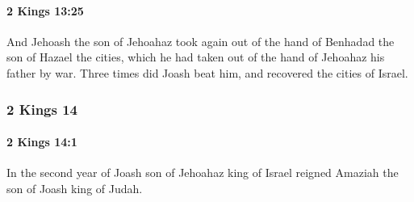 		\paragraph{2 Kings 13:25} %
			\label{2KINGS-13-25}

			And Jehoash the son of Jehoahaz took again out of the hand of Benhadad the son of Hazael the cities, which he had taken out of the hand of Jehoahaz his father by war. Three times did Joash beat him, and recovered the cities of Israel.

	\subsubsection{2 Kings 14} %
		\label{2KINGS-14}

		\paragraph{2 Kings 14:1} %
			\label{2KINGS-14-1}

			In the second year of Joash son of Jehoahaz king of Israel reigned Amaziah the son of Joash king of Judah.

